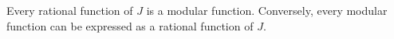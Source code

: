 Every rational function of $J$ is a modular function. Conversely, every modular function can be expressed as a rational function of $J$.
